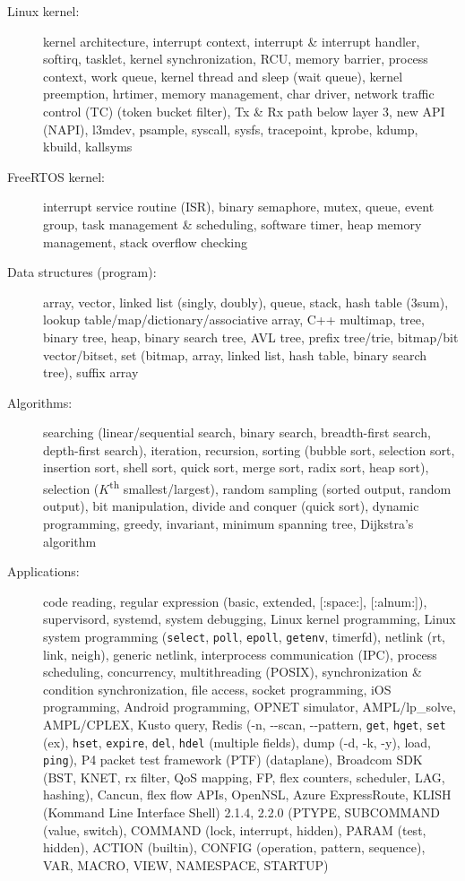 \documentclass[letterpaper,11pt]{article}
\begin{document}
\begin{description}
\item[Linux kernel:] kernel architecture, interrupt context, interrupt \& interrupt handler, softirq, tasklet, kernel synchronization,
RCU, memory barrier, process context, work queue, kernel thread and sleep (wait queue), kernel preemption, hrtimer, memory management,
char driver, network traffic control (TC) (token bucket filter), Tx \& Rx path below layer 3, new API (NAPI), l3mdev, psample,
syscall, sysfs, tracepoint, kprobe, kdump, kbuild, kallsyms

\item[FreeRTOS kernel:] interrupt service routine (ISR), binary semaphore, mutex, queue, event group, task management \& scheduling, software timer,
heap memory management, stack overflow checking

\item[Data structures (program):] array, vector, linked list (singly, doubly), queue, stack,
hash table (3sum), lookup table/map/dictionary/associative array, C++ multimap,
tree, binary tree, heap, binary search tree, AVL tree, prefix tree/trie,
bitmap/bit vector/bitset, set (bitmap, array, linked list, hash table, binary search tree),
suffix array

\item[Algorithms:] searching (linear/sequential search, binary search, breadth-first search, depth-first search), iteration, recursion,
sorting (bubble sort, selection sort, insertion sort, shell sort, quick sort, merge sort, radix sort, heap sort),
selection ($K$\textsuperscript{th} smallest/largest),
random sampling (sorted output, random output),
bit manipulation, divide and conquer (quick sort), dynamic programming, greedy, invariant, minimum spanning tree, Dijkstra's algorithm

\item[Applications:] code reading, regular expression (basic, extended, [:space:], [:alnum:]),
supervisord, systemd, system debugging, Linux kernel programming,
Linux system programming ({\tt select}, {\tt poll}, {\tt epoll}, {\tt getenv}, timerfd), netlink (rt, link, neigh), generic netlink,
interprocess communication (IPC), process scheduling,
concurrency, multithreading (POSIX), synchronization \& condition synchronization,
file access, socket programming,
%
iOS programming, Android programming,
OPNET simulator, AMPL/lp\_solve, AMPL/CPLEX, Kusto query,
%
Redis (-n, -{}-scan, -{}-pattern, {\tt get}, {\tt hget}, {\tt set} (ex), {\tt hset}, {\tt expire}, {\tt del}, {\tt hdel} (multiple fields),
dump (-d, -k, -y), load, {\tt ping}),
%
P4 packet test framework (PTF) (dataplane),
Broadcom SDK (BST, KNET, rx filter, QoS mapping, FP, flex counters, scheduler, LAG, hashing), Cancun, flex flow APIs, OpenNSL,
Azure ExpressRoute,
%
KLISH (Kommand Line Interface Shell) 2.1.4, 2.2.0 (PTYPE, SUBCOMMAND (value, switch), COMMAND (lock, interrupt, hidden), PARAM (test, hidden),
ACTION (builtin),
CONFIG (operation, pattern, sequence),
VAR, MACRO, VIEW, NAMESPACE, STARTUP)


\end{description}
\end{document}
